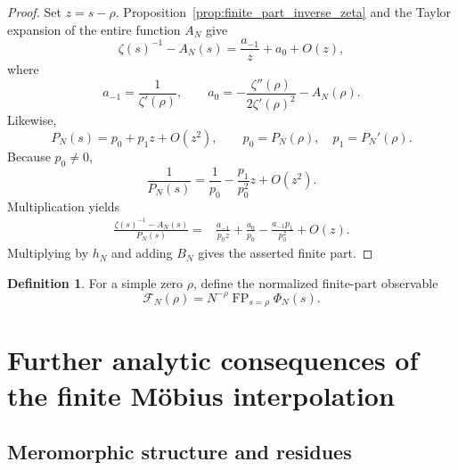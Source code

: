 \documentclass[11pt]{amsart}
\numberwithin{equation}{section}
\theoremstyle{plain}
\theoremstyle{definition}
\newtheorem{definition}[theorem]{Definition}
\theoremstyle{remark}
\DeclareMathOperator{\FP}{FP}
\newcommand{\1}{\mathbf{1}}
\begin{document}
\begin{proof}
Set \(z=s-\rho\).  Proposition~\ref{prop:finite_part_inverse_zeta} and
the Taylor expansion of the entire function \(A_N\) give
\begin{equation}
\zeta(s)^{-1}-A_N(s)
=
\frac{a_{-1}}{z}+a_0+O(z),
\label{eq:Phi_fp_numerator_detailed}
\end{equation}
where
\begin{equation}
a_{-1}=\frac1{\zeta'(\rho)},
\qquad
a_0=-\frac{\zeta''(\rho)}{2\zeta'(\rho)^2}-A_N(\rho).
\label{eq:Phi_fp_a_coefficients}
\end{equation}
Likewise,
\begin{equation}
P_N(s)
=
p_0+p_1z+O(z^2),
\qquad
p_0=P_N(\rho),\quad p_1=P_N'(\rho).
\label{eq:Phi_fp_denominator_detailed}
\end{equation}
Because \(p_0\neq0\),
\begin{equation}
\frac1{P_N(s)}
=
\frac1{p_0}-\frac{p_1}{p_0^2}z+O(z^2).
\label{eq:Phi_fp_inverse_denominator}
\end{equation}
Multiplication yields
\begin{align}
\frac{\zeta(s)^{-1}-A_N(s)}{P_N(s)}
={}&
\frac{a_{-1}}{p_0z}
+
\frac{a_0}{p_0}
-
\frac{a_{-1}p_1}{p_0^2}
+O(z).
\label{eq:Phi_fp_quotient_detailed}
\end{align}
Multiplying by \(h_N\) and adding \(B_N\) gives the asserted finite part.
\end{proof}

\begin{definition}
\label{def:finite_part_scale}
For a simple zero \(\rho\), define the normalized finite-part observable
\begin{equation}
\mathcal F_N(\rho)
=
N^{-\rho}\FP_{s=\rho}\Phi_N(s).
\label{eq:finite_part_scale}
\end{equation}
\end{definition}





\section{Further analytic consequences of the finite Möbius interpolation}
\label{sec:further_mobius_consequences}

\subsection{Meromorphic structure and residues}
\label{subsec:meromorphic_structure}
\end{document}
